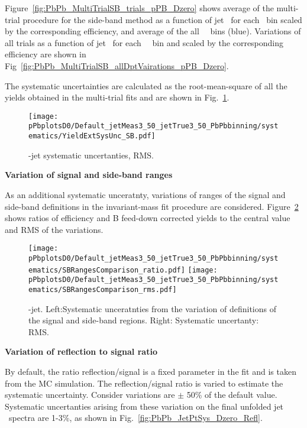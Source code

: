Figure~\ref{fig:PbPb_MultiTrialSB_trials_pPB_Dzero} shows average of the multi-trial procedure for the side-band method as a function of jet \pt\ for each \Dzero \pt\ bin scaled by the corresponding efficiency, and average of the all \Dzero\ \pt\ bins (blue). 
Variations of all trials as a function of jet \pt\ for each \Dzero\ \pt\ bin and scaled by the corresponding efficiency are shown in Fig~\ref{fig:PbPb_MultiTrialSB_allDptVairations_pPB_Dzero}.


The systematic uncertainties are calculated as the root-mean-square of all the yields obtained in the multi-trial fits and are shown in Fig.~\ref{fig:PbPb_MultiTrialRMS_pPB_Dzero}.
\begin{figure}[bth]
\begin{center}
\texttt{[image: pPbplotsD0/Default\_jetMeas3\_50\_jetTrue3\_50\_PbPbbinning/systematics/YieldExtSysUnc\_SB.pdf]}
\caption{\Dzero-jet systematic uncertanties, RMS.} 
\label{fig:PbPb_MultiTrialRMS_pPB_Dzero}
\end{center}
\end{figure}


\textbf{Variation of signal and side-band ranges}

As an additional systematic unceratnty, variations of ranges of the signal and side-band definitions in the invariant-mass fit procedure are considered.
Figure~\ref{fig:PbPb_JetPtSys_Dzero_SBvariaton} shows ratios of efficiency and B feed-down corrected yields to the central value and RMS of the variations.

\begin{figure}[bth]
\begin{center}
\texttt{[image: pPbplotsD0/Default\_jetMeas3\_50\_jetTrue3\_50\_PbPbbinning/systematics/SBRangesComparison\_ratio.pdf]}
\texttt{[image: pPbplotsD0/Default\_jetMeas3\_50\_jetTrue3\_50\_PbPbbinning/systematics/SBRangesComparison\_rms.pdf]}
\caption{\Dzero-jet. Left:Systematic unceratnties from the variation of definitions of the signal and side-band regions. Right: Systematic uncertanty: RMS.} 
\label{fig:PbPb_JetPtSys_Dzero_SBvariaton}
\end{center}
\end{figure}


\textbf{Variation of reflection to signal ratio}

By default, the ratio reflection/signal is a fixed parameter in the fit and is taken from the MC simulation. The reflection/signal ratio is varied to estimate the
systematic uncertainty. Consider variations are $\pm$ 50\% of the default value. Systematic uncertanties arising from these variation on the final unfolded jet \pt\ spectra are 1-3\%, as shown in Fig.~\ref{fig:PbPb_JetPtSys_Dzero_Refl}.

